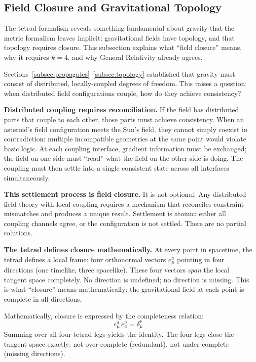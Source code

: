 \documentclass[aps,prd,preprint,superscriptaddress,showpacs,preprintnumbers,amsmath,amssymb,nofootinbib]{revtex4-2}
\begin{document}
\subsection{Field Closure and Gravitational Topology}
\label{subsec:closure}

The tetrad formalism reveals something fundamental about gravity that the metric formalism leaves implicit: gravitational fields have topology, and that topology requires closure. This subsection explains what ``field closure'' means, why it requires $k=4$, and why General Relativity already agrees.

Sections~\ref{subsec:propagates}--\ref{subsec:topology} established that gravity must consist of distributed, locally-coupled degrees of freedom. This raises a question: when distributed field configurations couple, how do they achieve consistency?

\textbf{Distributed coupling requires reconciliation.} If the field has distributed parts that couple to each other, those parts must achieve consistency. When an asteroid's field configuration meets the Sun's field, they cannot simply coexist in contradiction: multiple incompatible geometries at the same point would violate basic logic. At each coupling interface, gradient information must be exchanged; the field on one side must ``read'' what the field on the other side is doing. The coupling must then settle into a single consistent state across all interfaces simultaneously.

\textbf{This settlement process is field closure.} It is not optional. Any distributed field theory with local coupling requires a mechanism that reconciles constraint mismatches and produces a unique result. Settlement is atomic: either all coupling channels agree, or the configuration is not settled. There are no partial solutions.

\textbf{The tetrad defines closure mathematically.} At every point in spacetime, the tetrad defines a local frame: four orthonormal vectors $e^a_\mu$ pointing in four directions (one timelike, three spacelike). These four vectors \emph{span} the local tangent space completely. No direction is undefined; no direction is missing. This is what ``closure'' means mathematically: the gravitational field at each point is complete in all directions.

Mathematically, closure is expressed by the completeness relation:
\begin{equation}
e^a_\mu\, e_a^\nu = \delta_\mu^\nu
\label{eq:completeness}
\end{equation}
Summing over all four tetrad legs yields the identity. The four legs close the tangent space exactly: not over-complete (redundant), not under-complete (missing directions).
\end{document}
